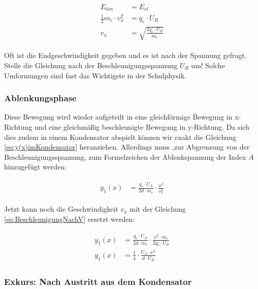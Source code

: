 \begin{align} \label{eq:BeschleunigungNachV}
\begin{split}
	E_{kin} &= E_{el} \\
	\frac{1}{2}m_e \cdot v_{x}^2 &= q_e \cdot U_B \\
	v_x &= \sqrt{\frac{2q_e \cdot U_B}{m_e}}
\end{split}
\end{align}

\begin{Aufgabe}
Oft ist die Endgeschwindigkeit gegeben und es ist nach der Spannung gefragt. Stelle die Gleichung nach der Beschleunigungsspannung $U_B$ um! Solche Umformungen sind fast das Wichtigste in der Schulphysik.
\end{Aufgabe}

\subsubsection{Ablenkungsphase}

Diese Bewegung wird wieder aufgeteilt in eine gleichförmige Bewegung in x-Richtung und eine gleichmäßig beschleunigte Bewegung in y-Richtung. Da sich dies zudem in einem Kondensator abspielt können wir exakt die Gleichung \ref{eq:y(x)imKondensator} heranziehen. Allerdings muss ,zur Abgrenzung von der Beschleunigungsspannung, zum Formelzeichen der Ablenkspannung der Index $A$ hinzugefügt werden:

\begin{align} \label{eq:y_1(x)Braun}
\begin{split}
	y_1(x) &= \frac{q_e \cdot U_A}{2d \cdot m_e} \cdot \frac{x^2}{v_{x}^2}
\end{split}
\end{align}

Jetzt kann noch die Geschwindigkeit $v_{x}$ mit der Gleichung \ref{eq:BeschleunigungNachV} ersetzt werden:

\begin{align} \label{eq:y_1(x)BraunMitV}
\begin{split}
	y_1(x) &= \frac{q_e \cdot U_A}{2d \cdot m_e} \cdot \frac{x^2 \cdot m_e}{2q_e \cdot U_B} \\
	y_1(x) &= \frac{1}{4} \cdot \frac{U_A \cdot x^2}{d \cdot U_B}
\end{split}
\end{align}


\subsubsection{Exkurs: Nach Austritt aus dem Kondensator}

